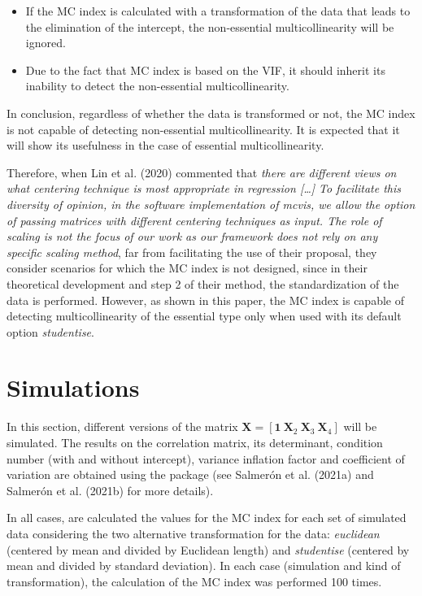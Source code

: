 \begin{itemize}
\tightlist
\item
  If the MC index is calculated with a transformation of the data that leads to the elimination of the intercept, the non-essential multicollinearity will be ignored.
\item
  Due to the fact that MC index is based on the VIF, it should inherit its inability to detect the non-essential multicollinearity.
\end{itemize}

In conclusion, regardless of whether the data is transformed or not, the MC index is not capable of detecting non-essential multicollinearity. It is expected that it will show its usefulness in the case of essential multicollinearity.

Therefore, when Lin et al. (2020) commented that \emph{there are different views on what centering technique is most appropriate in regression {[}\ldots{]} To facilitate this diversity of opinion, in the software implementation of mcvis, we allow the option of passing matrices with different centering techniques as input. The role of scaling is not the focus of our work as our framework does not rely on any specific scaling method}, far from facilitating the use of their proposal, they consider scenarios for which the MC index is not designed, since in their theoretical development and step 2 of their method, the standardization of the data is performed. However, as shown in this paper, the MC index is capable of detecting multicollinearity of the essential type only when used with its default option \emph{studentise}.

\hypertarget{simulations}{%
\section{Simulations}\label{simulations}}

In this section, different versions of the matrix \(\mathbf{X} = [\mathbf{1} \ \mathbf{X}_{2} \ \mathbf{X}_{3} \ \mathbf{X}_{4}]\) will be simulated. The results on the correlation matrix, its determinant, condition number (with and without intercept), variance inflation factor and coefficient of variation are obtained using the  package (see Salmerón et al. (2021a) and Salmerón et al. (2021b) for more details).

In all cases, are calculated the values for the MC index for each set of simulated data considering the two alternative transformation for the data: \emph{euclidean} (centered by mean and divided by Euclidean length) and \emph{studentise} (centered by mean and divided by standard deviation). In each case (simulation and kind of transformation), the calculation of the MC index was performed 100 times.

